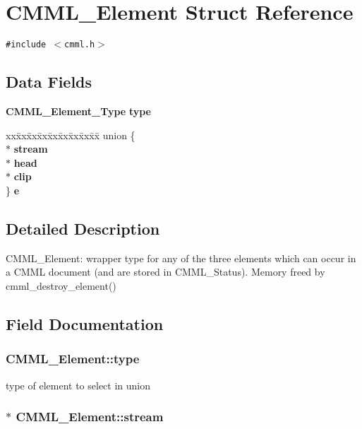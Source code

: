\section{CMML\_\-Element Struct Reference}
\label{structCMML__Element}
{\tt \#include $<$cmml.h$>$}

\subsection*{Data Fields}
\begin{CompactItemize}
\item 
{\bf CMML\_\-Element\_\-Type} {\bf type}
\item 
\begin{tabbing}
xx\=xx\=xx\=xx\=xx\=xx\=xx\=xx\=xx\=\kill
union \{\\
 $\ast$ {\bf stream}\\
 $\ast$ {\bf head}\\
 $\ast$ {\bf clip}\\
\} {\bf e}\\

\end{tabbing}\end{CompactItemize}


\subsection{Detailed Description}
CMML\_\-Element: wrapper type for any of the three elements which can occur in a CMML document (and are stored in CMML\_\-Status). Memory freed by cmml\_\-destroy\_\-element() 



\subsection{Field Documentation}
\subsubsection{ {\bf CMML\_\-Element::type}}\label{structCMML__Element_o0}


type of element to select in union 
\subsubsection{$\ast$ {\bf CMML\_\-Element::stream}}\label{structCMML__Element_o1}


